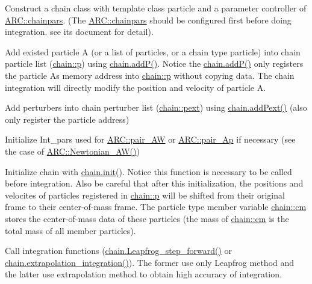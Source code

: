 \begin{DoxyEnumerate}
\item Construct a chain class with template class particle and a parameter controller of \hyperlink{classARC_1_1chainpars}{A\+R\+C\+::chainpars}. (The \hyperlink{classARC_1_1chainpars}{A\+R\+C\+::chainpars} should be configured first before doing integration. see its document for detail).
\item Add existed particle \textquotesingle{}A\textquotesingle{} (or a list of particles, or a chain type particle) into chain particle list (\hyperlink{classARC_1_1chain_af1793b656e139e1f87c2e0a55f87514b}{chain\+::p}) using \hyperlink{classARC_1_1chain_a0f91c399beb1e5c0db6ed7e2b4d00477}{chain.\+add\+P()}. Notice the \hyperlink{classARC_1_1chain_a0f91c399beb1e5c0db6ed7e2b4d00477}{chain.\+add\+P()} only registers the particle A\textquotesingle{}s memory address into \hyperlink{classARC_1_1chain_af1793b656e139e1f87c2e0a55f87514b}{chain\+::p} without copying data. The chain integration will directly modify the position and velocity of particle A.
\item Add perturbers into chain perturber list (\hyperlink{classARC_1_1chain_a6e4f41c7d3f8d44a4a01734ff4ab20cf}{chain\+::pext}) using \hyperlink{classARC_1_1chain_a029906394e7b73881c0980c00bf978f7}{chain.\+add\+Pext()} (also only register the particle address)
\item Initialize Int\+\_\+pars used for \hyperlink{namespaceARC_a5c4308ca4a8d0e0ff59fdce30f00274c}{A\+R\+C\+::pair\+\_\+\+AW} or \hyperlink{namespaceARC_aed8f19a0c6ae7dc0bb3696b337d7b9f6}{A\+R\+C\+::pair\+\_\+\+Ap} if necessary (see the case of \hyperlink{namespaceARC_ab9fc6518902e918927d8c6bd3d51401d}{A\+R\+C\+::\+Newtonian\+\_\+\+A\+W()})
\item Initialize chain with \hyperlink{classARC_1_1chain_aa016cf633d19079dca24565b80a36a3f}{chain.\+init()}. Notice this function is necessary to be called before integration. Also be careful that after this initialization, the positions and velocites of particles registered in \hyperlink{classARC_1_1chain_af1793b656e139e1f87c2e0a55f87514b}{chain\+::p} will be shifted from their original frame to their center-\/of-\/mass frame. The particle type member variable \hyperlink{classARC_1_1chain_ae9f6a5cbf7aac2b33c7274e7e10916ed}{chain\+::cm} stores the center-\/of-\/mass data of these particles (the mass of \hyperlink{classARC_1_1chain_ae9f6a5cbf7aac2b33c7274e7e10916ed}{chain\+::cm} is the total mass of all member particles).
\item Call integration functions (\hyperlink{classARC_1_1chain_a82b26731761231d86fd2e0b4529df6fa}{chain.\+Leapfrog\+\_\+step\+\_\+forward()} or \hyperlink{classARC_1_1chain_a0eb7768cb1b9099bbf66124d4c00164c}{chain.\+extrapolation\+\_\+integration()}). The former use only Leapfrog method and the latter use extrapolation method to obtain high accuracy of integration.

\end{DoxyEnumerate}
